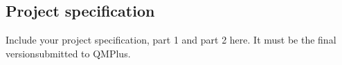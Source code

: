 \subsection*{Project specification}

\raggedright
Include your project specification, part 1 and part 2 here. It must be the final version\newline submitted to QMPlus. %



% 